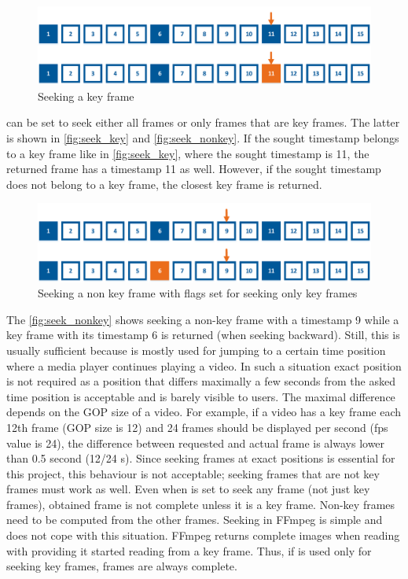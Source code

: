 \begin{figure}[!htbp]
\centering
\includegraphics[width=\textwidth]{fig/seeking_key}
\caption{Seeking a key frame}
\label{fig:seek_key}
\end{figure}
 can be set to seek either all frames or only frames that are key frames. The latter is shown in \autoref{fig:seek_key} and \autoref{fig:seek_nonkey}.
If the sought timestamp belongs to a key frame like in \autoref{fig:seek_key}, where the sought timestamp is 11, the returned frame has a timestamp 11 as well. However, if the sought timestamp does not belong to a key frame, the closest key frame is returned.
\begin{figure}[!htbp]
\centering
\includegraphics[width=\textwidth]{fig/seeking_non_key}
\caption{Seeking a non key frame with flags set for seeking only key frames}
\label{fig:seek_nonkey}
\end{figure}
The \autoref{fig:seek_nonkey} shows seeking a non-key frame with a timestamp 9 while a key frame with its timestamp 6 is returned (when seeking backward). Still, this is usually sufficient because  is mostly used for jumping to a certain time position where a media player continues playing a video. In such a situation exact position is not required as a position that differs maximally a few seconds from the asked time position is acceptable and is barely visible to users. The maximal difference depends on the GOP size of a video. For example, if a video has a key frame each 12th frame (GOP size is 12) and 24 frames should be displayed per second (fps value is 24), the difference between requested and actual frame is always lower than 0.5 second (12/24 s). Since seeking frames at exact positions is essential for this project, this behaviour is not acceptable; seeking frames that are not key frames must work as well.
Even when  is set to seek any frame (not just key frames), obtained frame is not complete unless it is a key frame. Non-key frames need to be computed from the other frames. Seeking in FFmpeg is simple and does not cope with this situation. FFmpeg returns complete images when reading with  providing it started reading from a key frame. Thus, if  is used only for seeking key frames, frames are always complete.

